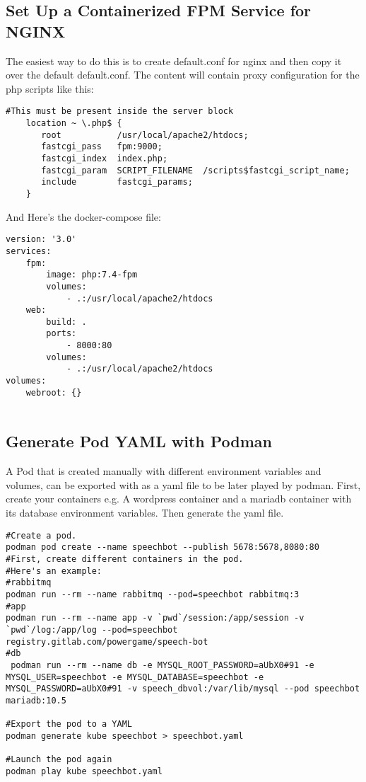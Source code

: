 \documentclass{article}
\begin{document}
\subsection{Set Up a Containerized FPM Service for NGINX}
The easiest way to do this is to create default.conf for nginx and then copy it over the default default.conf. The content will contain proxy configuration for the php scripts like this:  
\begin{verbatim}
#This must be present inside the server block
    location ~ \.php$ {                                                
       root           /usr/local/apache2/htdocs;                                           
       fastcgi_pass   fpm:9000;                                 
       fastcgi_index  index.php;                                      
       fastcgi_param  SCRIPT_FILENAME  /scripts$fastcgi_script_name;  
       include        fastcgi_params;                                 
    }   
\end{verbatim}
And Here's the docker-compose file:
\begin{verbatim}
version: '3.0'
services: 
    fpm:
        image: php:7.4-fpm
        volumes: 
            - .:/usr/local/apache2/htdocs
    web:
        build: .
        ports:
            - 8000:80
        volumes:
            - .:/usr/local/apache2/htdocs
volumes:
    webroot: {}
        
\end{verbatim}

\subsection{Generate Pod YAML with Podman}
A Pod that is created manually with different environment variables and volumes, can be exported with as a yaml file to be later played by podman. 
First, create your containers e.g. A wordpress container and a mariadb container with its database environment variables. Then generate the yaml file. 

\begin{verbatim}
#Create a pod. 
podman pod create --name speechbot --publish 5678:5678,8080:80
#First, create different containers in the pod. 
#Here's an example: 
#rabbitmq
podman run --rm --name rabbitmq --pod=speechbot rabbitmq:3
#app
podman run --rm --name app -v `pwd`/session:/app/session -v `pwd`/log:/app/log --pod=speechbot registry.gitlab.com/powergame/speech-bot
#db
 podman run --rm --name db -e MYSQL_ROOT_PASSWORD=aUbX0#91 -e MYSQL_USER=speechbot -e MYSQL_DATABASE=speechbot -e MYSQL_PASSWORD=aUbX0#91 -v speech_dbvol:/var/lib/mysql --pod speechbot mariadb:10.5
 
#Export the pod to a YAML
podman generate kube speechbot > speechbot.yaml

#Launch the pod again
podman play kube speechbot.yaml

\end{verbatim}
\end{document}
